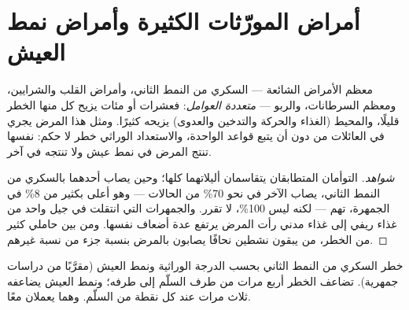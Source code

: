\section{أمراض المورّثات الكثيرة وأمراض نمط العيش}

\begin{proposition}\label{prop:g11:genes-and-disease:multifactorial}
معظم الأمراض الشائعة --- السكري من النمط الثاني، وأمراض القلب
والشرايين، ومعظم السرطانات، والربو --- \emph{متعددة
العوامل}: فعشرات أو مئات  يزيح كل
منها الخطر قليلًا، والمحيط (الغذاء والحركة والتدخين والعدوى) يزيحه
كثيرًا. ومثل هذا المرض يجري في العائلات من دون أن يتبع قواعد 
الواحدة، والاستعداد الوراثي خطر لا حكم:  نفسها تنتج المرض في
نمط عيش ولا تنتجه في آخر.
\end{proposition}
\begin{proof}[شواهد]
التوأمان المتطابقان يتقاسمان أليلاتهما كلها؛ وحين يصاب أحدهما بالسكري
من النمط الثاني، يصاب الآخر في نحو 70\% من الحالات --- وهو أعلى بكثير
من 8\% في الجمهرة،  تهم --- لكنه ليس 100\%،  لا
تقرر. والجمهرات التي انتقلت في جيل واحد من غذاء ريفي إلى غذاء مدني
رأت المرض يرتفع عدة أضعاف  نفسها. ومن بين حاملي كثير من
 الخطر، من يبقون نشطين نحافًا يصابون بالمرض بنسبة جزء من نسبة
غيرهم.
\end{proof}

\begin{omfigure}

{\small خطر السكري من النمط الثاني بحسب الدرجة الوراثية ونمط العيش
(مقرَّبًا من دراسات جمهرية).  تضاعف الخطر أربع مرات من طرف
السلّم إلى طرفه؛ ونمط العيش يضاعفه ثلاث مرات عند كل نقطة من السلّم.
وهما يعملان معًا.}
\end{omfigure}

